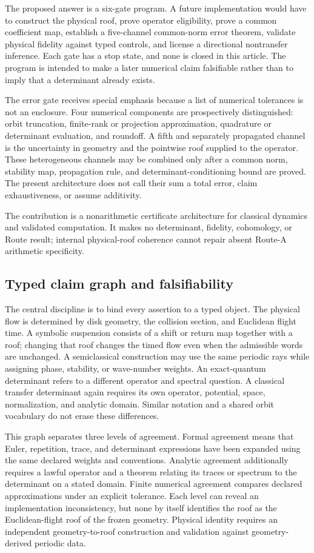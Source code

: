 \documentclass[11pt,a4paper]{article}
\begin{document}
The proposed answer is a six-gate program. A future implementation would have to construct the physical roof, prove operator eligibility, prove a common coefficient map, establish a five-channel common-norm error theorem, validate physical fidelity against typed controls, and license a directional nontransfer inference. Each gate has a stop state, and none is closed in this article. The program is intended to make a later numerical claim falsifiable rather than to imply that a determinant already exists.

The error gate receives special emphasis because a list of numerical tolerances is not an enclosure. Four numerical components are prospectively distinguished: orbit truncation, finite-rank or projection approximation, quadrature or determinant evaluation, and roundoff. A fifth and separately propagated channel is the uncertainty in geometry and the pointwise roof supplied to the operator. These heterogeneous channels may be combined only after a common norm, stability map, propagation rule, and determinant-conditioning bound are proved. The present architecture does not call their sum a total error, claim exhaustiveness, or assume additivity.

The contribution is a nonarithmetic certificate architecture for classical dynamics and validated computation. It makes no determinant, fidelity, cohomology, or Route result; internal physical-roof coherence cannot repair absent Route-A arithmetic specificity.

\subsection{Typed claim graph and falsifiability}

The central discipline is to bind every assertion to a typed object. The physical flow is determined by disk geometry, the collision section, and Euclidean flight time. A symbolic suspension consists of a shift or return map together with a roof; changing that roof changes the timed flow even when the admissible words are unchanged. A semiclassical construction may use the same periodic rays while assigning phase, stability, or wave-number weights. An exact-quantum determinant refers to a different operator and spectral question. A classical transfer determinant again requires its own operator, potential, space, normalization, and analytic domain. Similar notation and a shared orbit vocabulary do not erase these differences.

This graph separates three levels of agreement. Formal agreement means that Euler, repetition, trace, and determinant expressions have been expanded using the same declared weights and conventions. Analytic agreement additionally requires a lawful operator and a theorem relating its traces or spectrum to the determinant on a stated domain. Finite numerical agreement compares declared approximations under an explicit tolerance. Each level can reveal an implementation inconsistency, but none by itself identifies the roof as the Euclidean-flight roof of the frozen geometry. Physical identity requires an independent geometry-to-roof construction and validation against geometry-derived periodic data.
\end{document}
